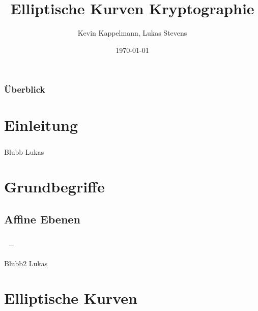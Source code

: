 \documentclass{beamer}
\title[Elliptische-Kurven-Kryptographie]{Elliptische Kurven Kryptographie} %
\author{Kevin Kappelmann, Lukas Stevens} %
\institute[TUM] %
{Technische Universität München \\ %
}
\date{\today} %
\theoremstyle{plain}
\theoremstyle{definition}
\theoremstyle{rem}
\begin{document}
\begin{frame}
\titlepage %
\end{frame}




\begin{frame}
	\frametitle{Überblick} %
\begin{multicols}{2}
\tableofcontents
\end{multicols}
\end{frame}


\section{Einleitung}

\begin{frame}
\frametitle{\insertsection}
Blubb Lukas
\end{frame}

\section{Grundbegriffe}
\subsection{Affine Ebenen}

\begin{frame}
\frametitle{\insertsection~--~\insertsubsection}
Blubb2 Lukas
\end{frame}


\section{Elliptische Kurven}
\end{document}
